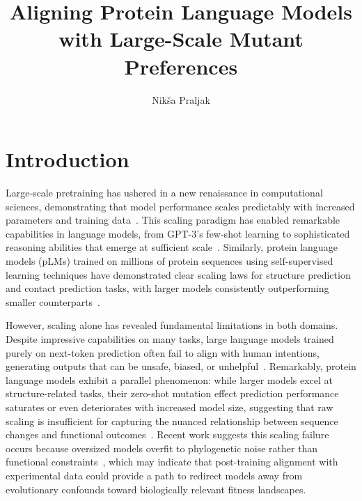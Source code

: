 \documentclass[]{fairmeta}
\title{Aligning Protein Language Models with Large-Scale Mutant Preferences}
\author[1]{Nikša Praljak}
\affiliation[1]{University of Chicago}
\begin{document}
\maketitle

\section{Introduction}
\label{sec:intro}

Large-scale pretraining has ushered in a new renaissance in computational sciences, demonstrating that model performance scales predictably with increased parameters and training data~\citep{kaplan2020scaling,hoffmann2022training}. This scaling paradigm has enabled remarkable capabilities in language models, from GPT-3's few-shot learning to sophisticated reasoning abilities that emerge at sufficient scale~\citep{brown2020language}. Similarly, protein language models (pLMs) trained on millions of protein sequences using self-supervised learning techniques have demonstrated clear scaling laws for structure prediction and contact prediction tasks, with larger models consistently outperforming smaller counterparts~\citep{rives2021biological,lin2023evolutionary}.

However, scaling alone has revealed fundamental limitations in both domains. Despite impressive capabilities on many tasks, large language models trained purely on next-token prediction often fail to align with human intentions, generating outputs that can be unsafe, biased, or unhelpful~\citep{ouyang2022training}. Remarkably, protein language models exhibit a parallel phenomenon: while larger models excel at structure-related tasks, their zero-shot mutation effect prediction performance saturates or even deteriorates with increased model size, suggesting that raw scaling is insufficient for capturing the nuanced relationship between sequence changes and functional outcomes~\citep{meier2021language,gordon2024protein,li2024feature,hou2025understanding}. Recent work suggests this scaling failure occurs because oversized models overfit to phylogenetic noise rather than functional constraints~\citep{weinstein2022non}, which may indicate that post-training alignment with experimental data could provide a path to redirect models away from evolutionary confounds toward biologically relevant fitness landscapes.
\end{document}
